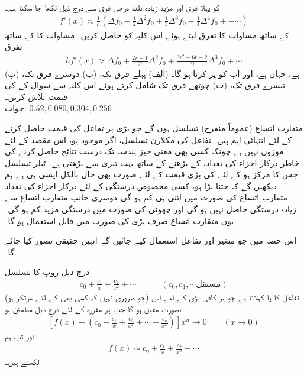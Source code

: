  کو پہلا فرق اور مزید زیادہ بلند درجی فرق سے درج ذیل لکھا جا سکتا ہے۔ 
\begin{align*}
f'(x)\approx \frac{1}{h}(\Delta f_0-\frac{1}{2}\Delta^2 f_0+\frac{1}{3}\Delta^3f_0-\frac{1}{4}\Delta^4 f_0+-\cdots)
\end{align*}
 کے ساتھ مساوات  کا  تفرق لیتے ہوئے اس کلیہ کو حاصل کریں۔ مساوات  کا  کے ساتھ تفرق
\begin{align*}
hf'(x)\approx \Delta f_0+\frac{2r-1}{2!}\Delta^2 f_0+\frac{3r^2-6r+2}{3!}\Delta^3f_0+\cdots
\end{align*}
ہے،  جہاں  ہے، اور آپ کو  پر کرنا ہو گا۔ (الف) پہلے فرق تک، (ب) دوسرے فرق تک، (پ) تیسرے فرق تک، (ت) چوتھے فرق تک  شامل کرتے ہوئے  اس کلیہ سے  سوال  کے  کی قیمت تلاش کریں۔ \\
جواب:\quad
$0.52, 0.080, 0.304, 0.256$

متقارب اتساع (عموماً منفرج) تسلسل ہوں گے جو بڑی  پر تفاعل  کی قیمت حاصل کرنے کے  لئے  انتہائی اہم ہیں۔ تفاعل  کی مکلارن تسلسل، اگر موجود ہو،  اس مقصد کے لئے موزوں نہیں ہے چونکہ  کسی بھی معنی خیز ہندسہ تک درست نتائج حاصل کرنے کی خاطر درکار اجزاء کی تعداد،  کے بڑھنے کے ساتھ بہت تیزی سے بڑھتی ہے۔ ٹیلر تسلسل جس کا مرکز  ہو کے لئے  کی بڑی قیمت کے لئے صورت بھی حال بالکل ایسی ہی ہے۔ہم دیکھیں گے کہ  جتنا بڑا ہو، کسی مخصوص درستگی کے لئے درکار اجزاء کی تعداد متقارب اتساع کی صورت میں اتنی ہی کم ہو گی۔دوسری جانب متقارب اتساع سے زیادہ درستگی حاصل نہیں ہو گی اور چھوٹی  کی صورت میں درستگی مزید کم ہو گی۔یوں متقارب اتساع صرف بڑی  کی صورت میں قابل استعمال ہو گا۔

اس حصہ میں جو متغیر اور تفاعل استعمال کیے جائیں گے انہیں حقیقی تصور کیا جائے گا۔

درج ذیل روپ کا تسلسل 
\begin{align*}
c_0+\frac{c_1}{x}+\frac{c_2}{x^2}+\cdots\quad\quad\quad (c_0,c_1,\cdots \text{مستقل})
\end{align*}
(جو ضروری نہیں کہ کسی بھی  کے لئے مرتکز ہو) تفاعل  کا   یا  کہلاتا ہے جو ہر کافی بڑی  کے لئے اس صورت معین ہو گا جب ہر مقررہ  کے لئے درج ذیل مطمئن ہو،
\begin{align}\label{مساوات_اعدادی_متقارب_الف}
[f(x)-(c_0+\frac{c_1}{x}+\frac{c_2}{x^2}+\cdots+\frac{c_n}{x^n})]x^n\to 0  \quad \quad (x\to 0) 
\end{align}
اور تب ہم
\begin{align*}
f(x) \sim c_0+\frac{c_1}{x}+\frac{c_2}{x^2}+\cdots
\end{align*}
لکھتے ہیں۔

